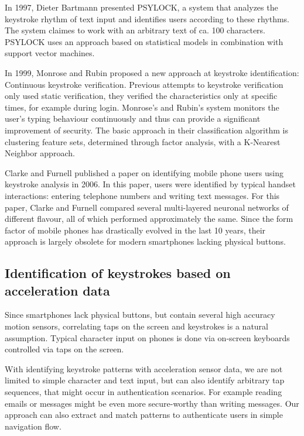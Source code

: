 In 1997, Dieter Bartmann presented PSYLOCK\cite{bartmann1997psylock}, a system that analyzes the keystroke rhythm of text input and identifies users according to these rhythms. The system claimes to work with an arbitrary text of ca. 100 characters. PSYLOCK uses an approach based on statistical models in combination with support vector machines.

In 1999, Monrose and Rubin\cite{monrose2000keystroke} proposed a new approach at keystroke identification: Continuous keystroke verification. Previous attempts to keystroke verification only used static verification, \ie they verified the characteristics only at specific times, for example during login. Monrose's and Rubin's system monitors the user's typing behaviour continuously and thus can provide a significant improvement of security. The basic approach in their classification algorithm is clustering feature sets, determined through factor analysis, with a K-Nearest Neighbor approach.

Clarke and Furnell\cite{clarke2007authenticating} published a paper on identifying mobile phone users using keystroke analysis in 2006. In this paper, users were identified by typical handset interactions: entering telephone numbers and writing text messages. For this paper, Clarke and Furnell compared several multi-layered neuronal networks of different flavour, all of which performed approximately the same. Since the form factor of mobile phones has drastically evolved in the last 10 years, their approach is largely obsolete for modern smartphones lacking physical buttons.
\subsection{Identification of keystrokes based on acceleration data}\label{subsection:keystrokerecognition}
Since smartphones lack physical buttons, but contain several high accuracy motion sensors, correlating taps on the screen and keystrokes is a natural assumption. Typical character input on phones is done via on-screen keyboards controlled via taps on the screen. 

With identifying keystroke patterns with acceleration sensor data, we are not limited to simple character and text input, but can also identify arbitrary tap sequences, that might occur in authentication scenarios. For example reading emails or messages might be even more secure-worthy than writing messages. Our approach can also extract and match patterns to authenticate users in simple navigation flow.

